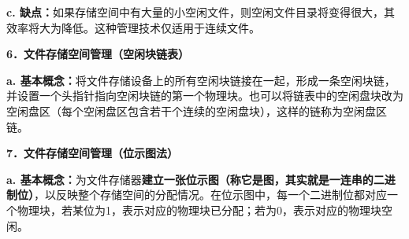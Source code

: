 \textbf{c.
缺点：}如果存储空间中有大量的小空闲文件，则空闲文件目录将变得很大，其效率将大为降低。这种管理技术仅适用于连续文件。

\textbf{\textbf{{{6．文件存储空间管理（}\textbf{{空闲块链表}}{）}}}}

\textbf{a.
基本概念：}将文件存储设备上的所有空闲块链接在一起，形成一条空闲块链，并设置一个头指针指向空闲块链的第一个物理块。也可以将链表中的空闲盘块改为空闲盘区（每个空闲盘区包含若干个连续的空闲盘块），这样的链称为空闲盘区链。

\textbf{\textbf{{7．文件存储空间管理（位示图法）}}}

\textbf{a.
基本概念：}为文件存储器\textbf{建立一张位示图（称它是图，其实就是一连串的二进制位）}，以反映整个存储空间的分配情况。在位示图中，每一个二进制位都对应一个物理块，若某位为1，表示对应的物理块已分配；若为0，表示对应的物理块空闲。
